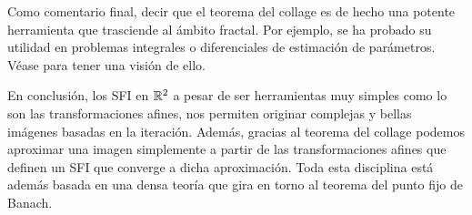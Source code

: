 Como comentario final, decir que el teorema del collage es de hecho una potente herramienta que trasciende al ámbito fractal. Por ejemplo, se ha probado su utilidad en problemas integrales o diferenciales de estimación de parámetros. Véase \cite{LaTorre} para tener una visión de ello.

En conclusión, los SFI en $\mathbb{R}^2$ a pesar de ser herramientas muy simples como lo son las transformaciones afines, nos permiten originar complejas y bellas imágenes basadas en la iteración. Además, gracias al teorema del collage podemos aproximar una imagen simplemente a partir de las transformaciones afines que definen un SFI que converge a dicha aproximación. Toda esta disciplina está además basada en una densa teoría que gira en torno al teorema del punto fijo de Banach.

